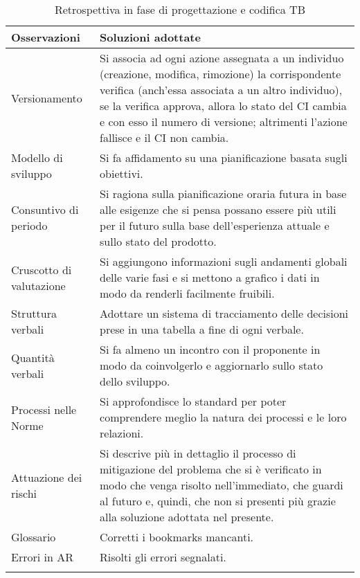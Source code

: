\documentclass[../piano_di_qualifica.tex]{subfiles}
\begin{document}
\begin{center}
	\begin{longtable}{|p{4cm}|p{11cm}|}
		\hline
		\rowcolor{lightgray}
		\textbf{Osservazioni} & \textbf{Soluzioni adottate} \\
		\hline

		Versionamento & Si associa ad ogni azione assegnata a un individuo (creazione, modifica, rimozione) la corrispondente verifica (anch'essa associata a un altro individuo), se la verifica approva, allora lo stato del CI cambia e con esso il numero di versione; altrimenti l'azione fallisce e il CI non cambia. \\
		Modello di sviluppo & Si fa affidamento su una pianificazione basata sugli obiettivi. \\
		Consuntivo di periodo & Si ragiona sulla pianificazione oraria futura in base alle esigenze che si pensa possano essere più utili per il futuro sulla base dell'esperienza attuale e sullo stato del prodotto. \\
		Cruscotto di valutazione & Si aggiungono informazioni sugli andamenti globali delle varie fasi e si mettono a grafico i dati in modo da renderli facilmente fruibili. \\
		Struttura verbali & Adottare un sistema di tracciamento delle decisioni prese in una tabella a fine di ogni verbale. \\
		Quantità verbali & Si fa almeno un incontro con il proponente in modo da coinvolgerlo e aggiornarlo sullo stato dello sviluppo. \\
		Processi nelle Norme & Si approfondisce lo standard \glossario{ISO/IEC 12207} per poter comprendere meglio la natura dei processi e le loro relazioni. \\
		Attuazione dei rischi & Si descrive più in dettaglio il processo di mitigazione del problema che si è verificato in modo che venga risolto nell'immediato, che guardi al futuro e, quindi, che non si presenti più grazie alla soluzione adottata nel presente. \\
		Glossario & Corretti i bookmarks mancanti. \\
		Errori in AR & Risolti gli errori segnalati. \\

		\hline
		\rowcolor{white}
		\caption{Retrospettiva in fase di progettazione e codifica TB}
	\end{longtable}
\end{center}

\end{document}
